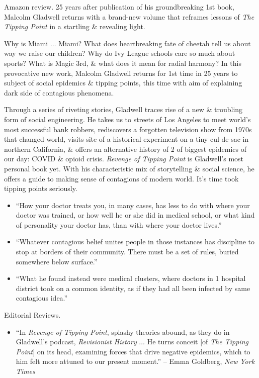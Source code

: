 \documentclass{article}
\begin{document}
\begin{enumerate}
	{\sf Amazon review.} 25 years after publication of his groundbreaking 1st book, {\sc Malcolm Gladwell} returns with a brand-new volume that reframes lessons of {\it The Tipping Point} in a startling \& revealing light.

	Why is Miami $\ldots$ Miami? What does heartbreaking fate of cheetah tell us about way we raise our children? Why do Ivy League schools care so much about sports? What is Magic 3rd, \& what does it mean for radial harmony? In this provocative new work, {\sc Malcolm Gladwell} returns for 1st time in 25 years to subject of social epidemics \& tipping points, this time with aim of explaining dark side of contagious phenomena.

	Through a series of riveting stories, {\sc Gladwell} traces rise of a new \& troubling form of social engineering. He takes us to streets of Los Angeles to meet world's most successful bank robbers, rediscovers a forgotten television show from 1970s that changed world, visits site of a historical experiment on a tiny cul-de-sac in northern California, \& offers an alternative history of 2 of biggest epidemics of our day: COVID \& opioid crisis. {\it Revenge of Tipping Point} is {\sc Gladwell}'s most personal book yet. With his characteristic mix of storytelling \& social science, he offers a guide to making sense of contagions of modern world. It's time took tipping points seriously.
	\begin{itemize}
		\item ``How your doctor treats you, in many cases, has less to do with where your doctor was trained, or how well he or she did in medical school, or what kind of personality your doctor has, than with where your doctor lives.''
		\item ``Whatever contagious belief unites people in those instances has discipline to stop at borders of their community. There must be a set of rules, buried somewhere below surface.''
		\item ``What he found instead were medical clusters, where doctors in 1 hospital district took on a common identity, as if they had all been infected by same contagious idea.''
	\end{itemize}
	{\sf Editorial Reviews.}
	\begin{itemize}
		\item ``In {\it Revenge of Tipping Point}, splashy theories abound, as they do in {\sc Gladwell}'s podcast, {\it Revisionist History} $\ldots$ He turns conceit [of {\it The Tipping Point}] on its head, examining forces that drive negative epidemics, which to him felt more attuned to our present moment.'' -- {\sc Emma Goldberg}, {\it New York Times}

\end{itemize}
\end{enumerate}
\end{document}
